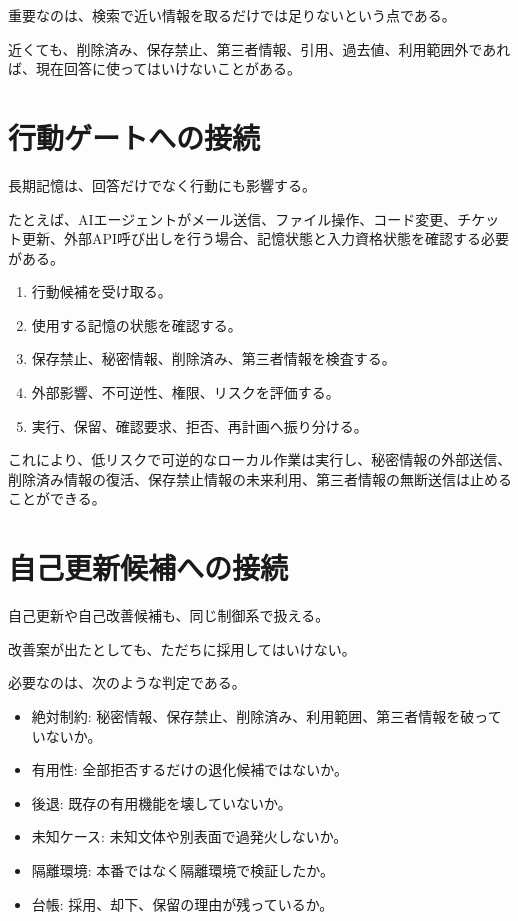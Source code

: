\documentclass[12pt,a4paper]{article}
\begin{document}
重要なのは、検索で近い情報を取るだけでは足りないという点である。

近くても、削除済み、保存禁止、第三者情報、引用、過去値、利用範囲外であれば、現在回答に使ってはいけないことがある。

\section{行動ゲートへの接続}\label{ux884cux52d5ux30b2ux30fcux30c8ux3078ux306eux63a5ux7d9a}

長期記憶は、回答だけでなく行動にも影響する。

たとえば、AIエージェントがメール送信、ファイル操作、コード変更、チケット更新、外部API呼び出しを行う場合、記憶状態と入力資格状態を確認する必要がある。

\begin{enumerate}
\def\labelenumi{\arabic{enumi}.}
\tightlist
\item
  行動候補を受け取る。
\item
  使用する記憶の状態を確認する。
\item
  保存禁止、秘密情報、削除済み、第三者情報を検査する。
\item
  外部影響、不可逆性、権限、リスクを評価する。
\item
  実行、保留、確認要求、拒否、再計画へ振り分ける。
\end{enumerate}

これにより、低リスクで可逆的なローカル作業は実行し、秘密情報の外部送信、削除済み情報の復活、保存禁止情報の未来利用、第三者情報の無断送信は止めることができる。

\section{自己更新候補への接続}\label{ux81eaux5df1ux66f4ux65b0ux5019ux88dcux3078ux306eux63a5ux7d9a}

自己更新や自己改善候補も、同じ制御系で扱える。

改善案が出たとしても、ただちに採用してはいけない。

必要なのは、次のような判定である。

\begin{itemize}
\tightlist
\item
  絶対制約: 秘密情報、保存禁止、削除済み、利用範囲、第三者情報を破っていないか。
\item
  有用性: 全部拒否するだけの退化候補ではないか。
\item
  後退: 既存の有用機能を壊していないか。
\item
  未知ケース: 未知文体や別表面で過発火しないか。
\item
  隔離環境: 本番ではなく隔離環境で検証したか。
\item
  台帳: 採用、却下、保留の理由が残っているか。
\end{itemize}
\end{document}
